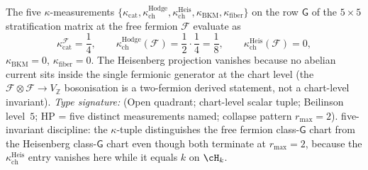 \begin{remark}
\label{rem:fermion-five-kappa-stratification}
The five $\kappa$-measurements
$\{\kappa_{\mathrm{cat}}, \kappa^{\mathrm{Hodge}}_{\mathrm{ch}},
\kappa^{\mathrm{Heis}}_{\mathrm{ch}}, \kappa_{\mathrm{BKM}},
\kappa_{\mathrm{fiber}}\}$ on the row $\mathsf{G}$ of the
$5\times 5$ stratification matrix at the free fermion $\mathcal F$
evaluate as
\[
\kappa_{\mathrm{cat}}^{\mathcal F}=\frac14,\qquad
\kappa^{\mathrm{Hodge}}_{\mathrm{ch}}(\mathcal F)=\frac12\cdot\frac14
=\frac18,\qquad
\kappa^{\mathrm{Heis}}_{\mathrm{ch}}(\mathcal F)=0,
\]
$\kappa_{\mathrm{BKM}}=0$, $\kappa_{\mathrm{fiber}}=0$.
The Heisenberg projection vanishes because no abelian current sits
inside the single fermionic generator at the chart level (the
$\mathcal F\otimes\mathcal F\to V_{\mathbb Z}$ bosonisation is a
two-fermion derived statement, not a chart-level invariant).
\emph{Type signature:} (Open quadrant; chart-level scalar tuple;
Beilinson level~$5$; HP = five distinct measurements named;
collapse pattern $r_{\max}=2$). five-invariant discipline: the
$\kappa$-tuple distinguishes the free fermion class-$\mathsf{G}$
chart from the Heisenberg class-$\mathsf{G}$ chart even though
both terminate at $r_{\max}=2$, because the
$\kappa^{\mathrm{Heis}}_{\mathrm{ch}}$ entry vanishes here while it
equals $k$ on $\cH_k$.
\end{remark}

